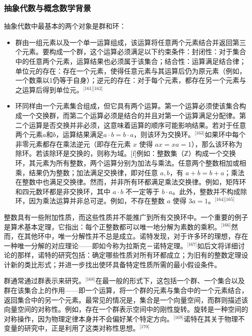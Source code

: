 \subsubsection{抽象代数与概念数学背景}
抽象代数中最基本的两个对象是群和环：
\begin{itemize}
\item 群由一组元素以及一个单一运算组成，该运算将任意两个元素结合并返回第三个元素。要构成一个群，这个运算必须满足以下约束条件：封闭性：对于集合中的任意两个元素，运算结果也必须属于该集合；结合性：运算满足结合律；单位元的存在：存在一个元素，使得任意元素与其运算后仍为原元素（例如，一个数乘以1仍等于自身）；逆元的存在：对于每个元素，都存在另一个元素与之运算后得到单位元。\(^\text{[161][162]}\)
\item 环同样由一个元素集合组成，但它具有两个运算。第一个运算必须使该集合构成一个交换群，而第二个运算必须是结合的并且对第一个运算满足分配律。第二个运算是否交换并非必须，这意味着运算的顺序可能影响结果。若对于任意两个元素$a$和$b$，运算结果满足$a\cdot b = b\cdot a$，则该环为交换环。\(^\text{[163]}\)如果环中每个非零元素都存在乘法逆元（即存在元素 $x$ 使得 $ax = xa = 1$），那么该环称为除环。若该除环是交换的，则称为域。[f]例如：整数集（ℤ）构成一个交换环，其元素为所有整数，两个运算分别为加法与乘法。任意两个整数相加或相乘，结果仍为整数；加法满足交换律，即对任意 $a,b$，有 $a + b = b + a$；乘法在整数中也满足交换律。然而，并非所有环都满足乘法交换律。例如，矩阵环和四元数环都是非交换环，其中 $a\cdot b$ 不一定等于 $b\cdot a$。此外，整数并不构成除环，因为乘法运算并非总可逆。例如，不存在整数 $a$ 使得 $3a = 1$。\(^\text{[164][165]}\)
\end{itemize}
整数具有一些附加性质，而这些性质并不能推广到所有交换环中。一个重要的例子是算术基本定理，它指出：每个正整数都可以唯一地分解为素数的乘积。\(^\text{[166]}\)然而，在其他环中，唯一分解性并不总是成立。诺特发现，对于许多环的理想，存在一种唯一分解的对应理论——即如今称为拉斯克－诺特定理。\(^\text{[167]}\)如后文将详细讨论的那样，诺特的研究包括：确定哪些性质对所有环都成立；为旧有的整数定理设计新的类比形式；并进一步找出使环具备特定性质所需的最小假设条件。

群通常通过群表示来研究。\(^\text{[168]}\)在最一般的形式下，这包括一个群、一个集合以及群在该集合上的作用——即一个运算，将一个群的元素与集合中的一个元素结合，返回集合中的另一个元素。最常见的情况是，集合是一个向量空间，而群则描述该向量空间的对称性。例如，存在一个群表示空间中的刚性旋转。旋转是一种空间的对称操作，因为物理定律本身并不会偏好某个特定方向。\(^\text{[169]}\)诺特在其关于物理不变量的研究中，正是利用了这类对称性思想。\(^\text{[170]}\)

